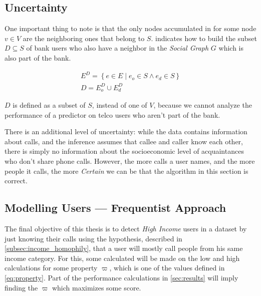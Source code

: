 \subsection{Uncertainty}
\label{subsec:uncertainty}

One important thing to note is that the only nodes accumulated in  for some node $v \in V$ are the neighboring ones that belong to $S$.  indicates how to build the subset $D \subseteq S$ of bank users who also have a neighbor in the \emph{Social Graph} $G$ which is also part of the bank.

\begin{equation}
\label{eq:subset_neighbours}
\begin{gathered}
E^D = \left\{ e \in E \mid e_o \in S \land e_d \in S \right\} \\
D = E^D_o \cup E^D_d
\end{gathered}
\end{equation}

$D$ is defined as a subset of $S$, instead of one of $V$, because we cannot analyze the performance of a predictor on telco users who aren't part of the bank.

There is an additional level of uncertainty: while the data contains information about calls, and the inference assumes that callee and caller know each other, there is simply no information about the socioeconomic level of acquaintances who don't share phone calls. However, the more calls a user names, and the more people it calls, the more \emph{Certain} we can be that the algorithm in this section is correct.

\subsection{Modelling Users --- Frequentist Approach}
\label{subsec:modelling_users_frequentist}

The final objective of this thesis is to detect \emph{High Income} users in a dataset by just knowing their calls using the hypothesis, described in \cref{subsec:income_homophily}, that a user will mostly call people from his same income category. For this, some calculated will be made on the low and high calculations for some property $\varpi$\footnotemark{}, which is one of the values defined in \cref{eq:property}. Part of the performance calculations in \cref{sec:results} will imply finding the $\varpi$ which maximizes some score.

